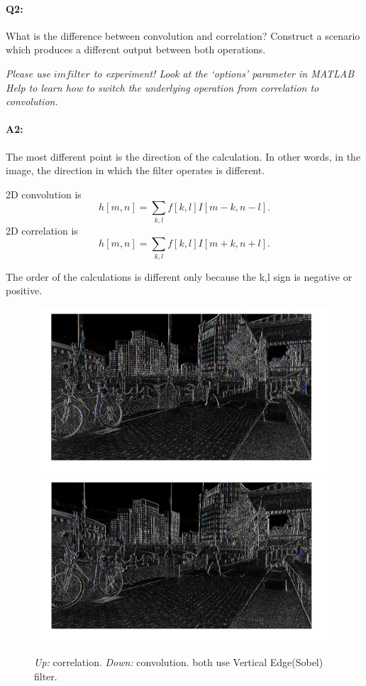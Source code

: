 	\paragraph{Q2:} What is the difference between convolution and correlation? Construct a scenario which produces a different output between both operations.
	
	\emph{Please use \href{https://www.mathworks.com/help/images/ref/imfilter.html}{$imfilter$} to experiment! Look at the `options' parameter in MATLAB Help to learn how to switch the underlying operation from correlation to convolution.}
	
	\paragraph{A2:} The most different point is the direction of the calculation. In other words, in the image, the direction in which the filter operates is different.

	2D convolution is $$h[m,n] = \sum_{k,l} f[k,l]I[m-k,n-l].$$
	2D correlation is  $$h[m,n] = \sum_{k,l} f[k,l]I[m+k,n+l].$$

	The order of the calculations is different only because the k,l sign is negative or positive.

\begin{figure}[h]
    \centering
    \includegraphics[width=11cm]{hw2_q2_corr.jpg}
    \includegraphics[width=11cm]{hw2_q2_conv.jpg}
    \caption{\emph{Up:} correlation. \emph{Down:} convolution. both use Vertical Edge(Sobel) filter.}
    \label{fig:result1}
\end{figure}

